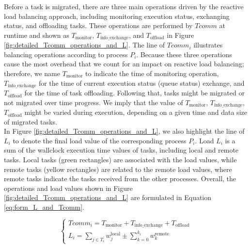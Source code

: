 Before a task is migrated, there are three main operations driven by the reactive load balancing approach, including monitoring execution status, exchanging status, and offloading tasks. These operations are performed by $Tcomm$ at runtime and shown as $T_{\text{monitor}}$, $T_{\text{info\_exchange}}$, and $T_{\text{offload}}$ in Figure \ref{fig:detailed_Tcomm_operations_and_L}. The line of $Tcomm_{i}$ illustrates balancing operations according to process $P_{i}$. Because these three operations cause the most overhead that we count for an impact on reactive load balancing; therefore, we name $T_{\text{monitor}}$ to indicate the time of monitoring operation, $T_{\text{info\_exchange}}$ for the time of current execution status (queue status) exchange, and $T_{\text{offload}}$ for the time of task offloading. Following that, tasks might be migrated or not migrated over time progress. We imply that the value of $T_{\text{monitor}}$, $T_{\text{info\_exchange}}$, $T_{\text{offload}}$ might be varied during execution, depending on a given time and data size of migrated tasks.\\

In Figure \ref{fig:detailed_Tcomm_operations_and_L}, we also highlight the line of $L_{i}$ to denote the final load value of the corresponding process $P_{i}$. Load $L_{i}$ is a sum of the wallclock execution time values of tasks, including local and remote tasks. Local tasks (green rectangles) are associated with the load values, while remote tasks (yellow rectangles) are related to the remote load values, where remote tasks indicate the tasks received from the other processes. Overall, the operations and load values shown in Figure \ref{fig:detailed_Tcomm_operations_and_L} are formulated in Equation \ref{eq:form_L_and_Tcomm}.

\begin{equation} \label{eq:form_L_and_Tcomm}
	\begin{cases}
		Tcomm_{i} = T_{\text{monitor}} + T_{\text{info\_exchange}} + T_{\text{offload}} \\
		L_{i} = \sum_{j \in T^{'}_{i}} w_{j}^{\text{local}} \pm \sum_{k=0}^{k_{i}} w_{k}^{\text{remote}}
	\end{cases}
\end{equation}

